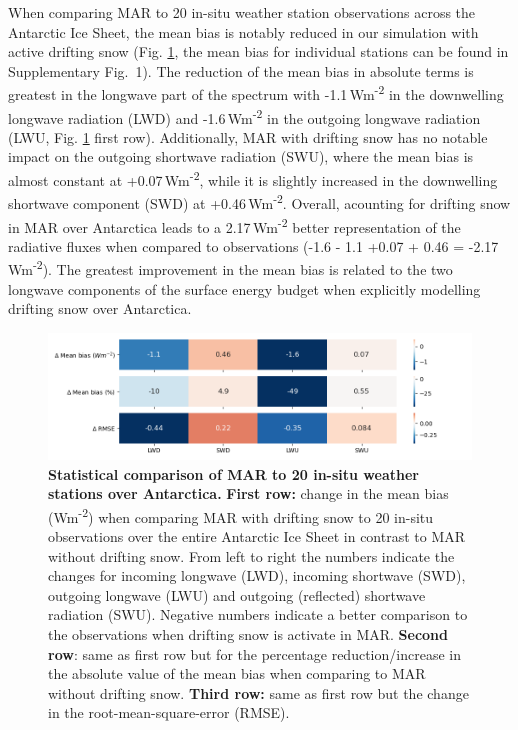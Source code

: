 \documentclass[draft]{agujournal2019}
\begin{document}
When comparing MAR to 20 in-situ weather station observations across the Antarctic Ice Sheet, the mean bias is notably reduced in our simulation with active drifting snow (Fig. \ref{fig:heat}, the mean bias for individual stations can be found in Supplementary Fig.~1). The reduction of the mean bias in absolute terms is greatest in the longwave part of the spectrum with -1.1\,Wm\textsuperscript{-2} in the downwelling longwave radiation (LWD) and -1.6\,Wm\textsuperscript{-2} in the outgoing longwave radiation (LWU, Fig. \ref{fig:heat} first row). Additionally, MAR with drifting snow has no notable impact on the outgoing shortwave radiation (SWU), where the mean bias is almost constant at +0.07\,Wm\textsuperscript{-2}, while it is slightly increased in the downwelling shortwave component (SWD) at +0.46\,Wm\textsuperscript{-2}. Overall, acounting for drifting snow in MAR over Antarctica leads to a 2.17\,Wm\textsuperscript{-2} better representation of the radiative fluxes when compared to observations (-1.6 - 1.1 +0.07 + 0.46 = -2.17\,Wm\textsuperscript{-2}). The greatest improvement in the mean bias is related to the two longwave components of the surface energy budget when explicitly modelling drifting snow over Antarctica.


\begin{figure}[H]
	\includegraphics[width=1.1\textwidth]{heatmap_new.png}
	\caption{\textbf{Statistical comparison of MAR to 20 in-situ weather stations over Antarctica.} \textbf{First row:} change in the mean bias (Wm\textsuperscript{-2}) when comparing MAR with drifting snow to 20 in-situ observations over the entire Antarctic Ice Sheet in contrast to MAR without drifting snow. From left to right the numbers indicate the changes for incoming longwave (LWD), incoming shortwave (SWD), outgoing longwave (LWU) and outgoing (reflected) shortwave radiation (SWU). Negative numbers indicate a better comparison to the observations when drifting snow is activate in MAR. \textbf{Second row}: same as first row but for the percentage reduction/increase in the absolute value of the mean bias when comparing to MAR without drifting snow. \textbf{Third row:} same as first row but the change in the root-mean-square-error (RMSE).}
	\label{fig:heat}
\end{figure}
\end{document}
